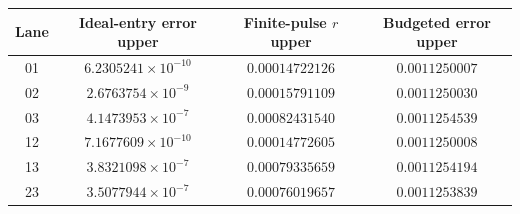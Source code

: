 \begin{tabular}{@{}c c c c@{}}
\toprule
Lane & Ideal-entry error upper & Finite-pulse $r$ upper & Budgeted error upper\\
\midrule
01 & $6.2305241\times10^{-10}$ & $0.00014722126$ & $0.0011250007$ \\
02 & $2.6763754\times10^{-9}$ & $0.00015791109$ & $0.0011250030$ \\
03 & $4.1473953\times10^{-7}$ & $0.00082431540$ & $0.0011254539$ \\
12 & $7.1677609\times10^{-10}$ & $0.00014772605$ & $0.0011250008$ \\
13 & $3.8321098\times10^{-7}$ & $0.00079335659$ & $0.0011254194$ \\
23 & $3.5077944\times10^{-7}$ & $0.00076019657$ & $0.0011253839$ \\
\bottomrule
\end{tabular}

